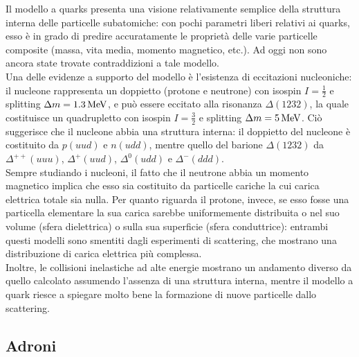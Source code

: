 Il modello a quarks presenta una visione relativamente semplice della struttura interna delle particelle subatomiche: con pochi parametri liberi relativi ai quarks, esso è in grado di predire accuratamente le proprietà delle varie particelle composite (massa, vita media, momento magnetico, etc.). Ad oggi non sono ancora state trovate contraddizioni a tale modello.\\
Una delle evidenze a supporto del modello è l'esistenza di eccitazioni nucleoniche: il nucleone rappresenta un doppietto (protone e neutrone) con isospin $ I = \frac{1}{2} $ e splitting $ \Delta m = 1.3\,\mathrm{MeV} $, e può essere eccitato alla risonanza $ \Delta (1232) $, la quale costituisce un quadrupletto con isospin $ I = \frac{3}{2} $ e splitting $ \Delta m = 5\,\mathrm{MeV} $. Ciò suggerisce che il nucleone abbia una struttura interna: il doppietto del nucleone è costituito da $ p (uud) $ e $ n (udd) $, mentre quello del barione $ \Delta (1232) $ da $ \Delta^{++} (uuu) $, $ \Delta^+ (uud) $, $ \Delta^0 (udd) $ e $ \Delta^- (ddd) $.\\
Sempre studiando i nucleoni, il fatto che il neutrone abbia un momento magnetico implica che esso sia costituito da particelle cariche la cui carica elettrica totale sia nulla. Per quanto riguarda il protone, invece, se esso fosse una particella elementare la sua carica sarebbe uniformemente distribuita o nel suo volume (sfera dielettrica) o sulla sua superficie (sfera conduttrice): entrambi questi modelli sono smentiti dagli esperimenti di scattering, che mostrano una distribuzione di carica elettrica più complessa.\\
Inoltre, le collisioni inelastiche ad alte energie mostrano un andamento diverso da quello calcolato assumendo l'assenza di una struttura interna, mentre il modello a quark riesce a spiegare molto bene la formazione di nuove particelle dallo scattering.

\subsection{Adroni}


